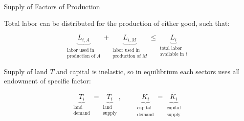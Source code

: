 \documentclass[notes,11pt, aspectratio=169, xcolor=table]{beamer}
\newenvironment{wideitemize}{\itemize\addtolength{\itemsep}{10pt}}{\enditemize}
\begin{document}
\begin{frame}{Supply of Factors of Production}
\begin{wideitemize}
        \item Total labor can be distributed for the production of either good, such that:

        \begin{equation*}
            \underbrace{L_{i,A}}_{\substack{\text{labor used in} \\ \text{production of } A}} + \underbrace{L_{i,M}}_{\substack{\text{labor used in} \\ \text{production of } M}} \le \underbrace{L_i}_{\substack{\text{total labor} \\ \text{available in } i}}
        \end{equation*}

        \item Supply of land $T$ and capital is inelastic, so in equilibrium each sectors uses all endowment of specific factor:

        \begin{equation*}
            \underbrace{T_i}_{\substack{\text{land} \\ \text{demand}}} = \underbrace{\bar{T}_i}_{\substack{\text{land} \\ \text{supply}}}, \qquad              \underbrace{K_i}_{\substack{\text{capital} \\ \text{demand}}} = \underbrace{\bar{K}_i}_{\substack{\text{capital} \\ \text{supply}}} 
        \end{equation*}
\end{wideitemize}
\end{frame}
\end{document}
